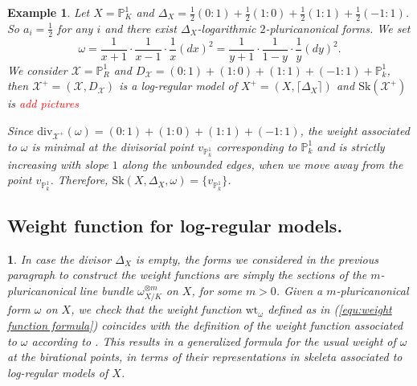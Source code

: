 \documentclass{amsart}%
\numberwithin{equation}{subsection}
\theoremstyle{plain2}
\theoremstyle{definition2}
\newtheorem{example}[equation]{Example}
\theoremstyle{stepstyle}
\theoremstyle{point}
\theoremstyle{subpoint}
\newtheorem{subpoint}[equation]{}%
\newcommand{\spa}[1]{\begin{subpoint}#1\end{subpoint}}           %
\newcommand{\cX}{\ensuremath{\mathscr{X}}}
\newcommand{\divisor}{\mathrm{div}}
\newcommand{\weight}{\mathrm{wt}}
\newcommand{\Sk}{\mathrm{Sk}}
\begin{document}
\begin{example}
Let $X=\mathbb{P}^1_K$ and $\Delta_X=\frac{1}{2}(0:1) + \frac{1}{2}(1:0)+\frac{1}{2}(1:1)+\frac{1}{2}(-1:1)$. So $a_i=\frac{1}{2}$ for any $i$ and there exist $\Delta_X$-logarithmic $2$-pluricanonical forms. We set $$\omega = \frac{1}{x+1} \cdot \frac{1}{x-1} \cdot \frac{1}{x} (dx)^2= \frac{1}{y+1} \cdot \frac{1}{1-y}\cdot \frac{1}{y} (dy)^2.$$ We consider $\cX= \mathbb{P}_R^1$ and $D_\cX= (0:1) + (1:0)+ (1:1)+(-1:1)+ \mathbb{P}^1_k$, then $\cX^+=(\cX,D_\cX)$ is a log-regular model of $X^+=(X,\lceil \Delta_X \rceil)$ and $\Sk(\cX^+)$ is \textcolor{red}{add pictures}

Since $\divisor_{\cX^+}(\omega)= (0:1) + (1:0)+ (1:1)+(-1:1)$, the weight associated to $\omega$ is minimal at the divisorial point $v_{\mathbb{P}_k^1}$ corresponding to $\mathbb{P}^1_k$ and is strictly increasing with slope $1$ along the unbounded edges, when we move away from the point $v_{\mathbb{P}^1_k}$. Therefore, $\Sk(X,\Delta_X,\omega)=\{v_{\mathbb{P}^1_k}\}$.
\end{example}

\subsection{Weight function for log-regular models.}
\spa{In case the divisor $\Delta_X$ is empty, the forms we considered in the previous paragraph to construct the weight functions are simply the sections of the $m$-pluricanonical line bundle $\omega_{X/K}^{\otimes m}$ on $X$, for some $m>0$. Given a $m$-pluricanonical form $\omega$ on $X$, we check that the weight function $\weight_{\omega}$ defined as in (\ref{equ:weight function formula}) coincides with the definition of the weight function associated to $\omega$ according to \cite{MustataNicaise}. This results in a generalized formula for the usual weight of $\omega$ at the birational points, in terms of their representations in skeleta associated to log-regular models of $X$.}
\end{document}
